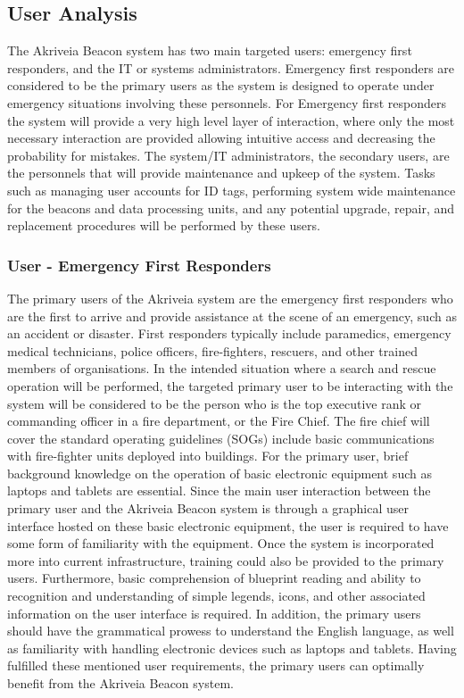 

\subsection{User Analysis}
\medskip
The Akriveia Beacon system has two main targeted users: emergency first responders, and the IT or systems administrators. Emergency first responders are considered to be the primary users as the system is designed to operate under emergency situations involving these personnels. For Emergency first responders the system will provide a very high level layer of interaction, where only the most necessary interaction are provided allowing intuitive access and decreasing the probability for mistakes. The system/IT administrators, the secondary users, are the personnels that will provide maintenance and upkeep of the system. Tasks such as managing user accounts for ID tags, performing system wide maintenance for the beacons and data processing units, and any potential upgrade, repair, and replacement procedures will be performed by these users. 
\bigskip


\subsubsection{User - Emergency First Responders}
\medskip
The primary users of the Akriveia system are the emergency first responders who are the first to arrive and provide assistance at the scene of an emergency, such as an accident or disaster. First responders typically include paramedics, emergency medical technicians, police officers, fire-fighters, rescuers, and other trained members of organisations. In the intended situation where a search and rescue operation will be performed, the targeted primary user to be interacting with the system will be considered to be the person who is the top executive rank or commanding officer in a fire department, or the Fire Chief. The fire chief will cover the standard operating guidelines (SOGs) include basic communications with fire-fighter units deployed into buildings. 
\medskip
For the primary user, brief background knowledge on the operation of basic electronic equipment such as laptops and tablets are essential. Since the main user interaction between the primary user and the Akriveia Beacon system is through a graphical user interface hosted on these basic electronic equipment, the user is required to have some form of familiarity with the equipment. Once the system is incorporated more into current infrastructure, training could also be provided to the primary users. Furthermore, basic comprehension of blueprint reading and ability to recognition and understanding of simple legends, icons, and other associated information on the user interface is required. In addition, the primary users should have the grammatical prowess to understand the English language, as well as familiarity with handling electronic devices such as laptops and tablets. Having fulfilled these mentioned user requirements, the primary users can optimally benefit from the Akriveia Beacon system.
\bigskip


